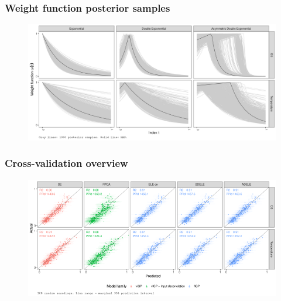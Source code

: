 \documentclass[aspectratio=169,t]{beamer}
\begin{document}
\begin{frame}
  \frametitle{Weight function posterior samples}
  
  \begin{figure}
    \centering
    \includegraphics[width=1\textwidth]{fit-full-posterior-weights-selected.png}
  \end{figure}
\end{frame}

\begin{frame}
  \frametitle{Cross-validation overview}
  
  \begin{figure}
    \centering
    \includegraphics[width=1\textwidth]{xvalidation-actual-predicted-scatterplot-selected}
  \end{figure}
\end{frame}
\end{document}
